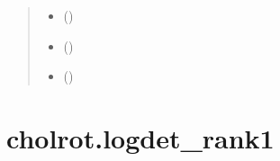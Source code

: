 \documentclass[a4paper,11pt,english]{sphinxmanual}
\begin{document}
\begin{fulllineitems}
\begin{quote}
\begin{description}
\begin{itemize}
\item {} 
\sphinxAtStartPar
{} ()

\item {} 
\sphinxAtStartPar
{} ()

\item {} 
\sphinxAtStartPar
{} ()

\end{itemize}

\sphinxAtStartPar
{}

\end{description}\end{quote}

\end{fulllineitems}


\sphinxstepscope


\section{cholrot.logdet\_rank1}
\label{\detokenize{generated/cholrot.logdet_rank1:cholrot-logdet-rank1}}\label{\detokenize{generated/cholrot.logdet_rank1::doc}}
\end{document}
